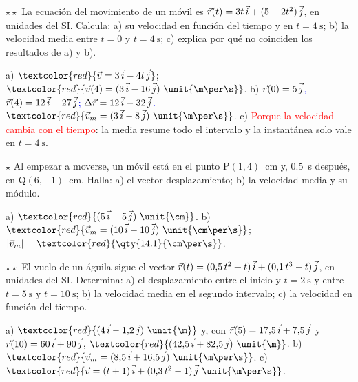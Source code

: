 \begin{exercise}
    \(\star\star\) La ecuación del movimiento de un móvil es \(\vec r(t) = 3t\,\vec{i} + (5 - 2t^2)\,\vec{j}\), en unidades del SI.
    Calcula: a) su velocidad en función del tiempo y en \(t = \qty{4}{\s}\); b) la velocidad media entre \(t = 0\) y
    \(t = \qty{4}{\s}\); c) explica por qué no coinciden los resultados de a) y b).
    \begin{solu}
        a) \(\textcolor{red}{\vec v = 3\,\ivec - 4t\,\jvec}\); \(\textcolor{red}{\vec v(4) = (3\,\ivec - 16\,\jvec)~\unit{\m\per\s}}\).
        b) \textcolor{blue}{\(\vec r(0) = 5\,\vec{j}\), \(\vec r(4) =
        12\,\vec{i} - 27\,\vec{j}\); \(\Delta\vec r = 12\,\vec{i} - 32\,\vec{j}\).} \(\textcolor{red}{\vec v_m = (3\,\ivec - 8\,\jvec)~\unit{\m\per\s}}\).
        c) \textcolor{red}{Porque la velocidad cambia con el tiempo}: la media resume todo el intervalo y la instantánea solo vale
        en \(t = \qty{4}{\s}\).
    \end{solu}
\end{exercise}

\begin{exercise}
    \(\star\) Al empezar a moverse, un móvil está en el punto P\((1, 4)\)~\unit{\cm} y, \qty{0.5}{\s} después, en Q\((6, -1)\)~\unit{\cm}.
    Halla: a) el vector desplazamiento; b) la velocidad media y su módulo.
    \begin{solu}
        a) \(\textcolor{red}{(5\,\ivec - 5\,\jvec)~\unit{\cm}}\). b) \(\textcolor{red}{\vec v_m = (10\,\ivec - 10\,\jvec)~\unit{\cm\per\s}}\);
        \(|\vec v_m| = \textcolor{red}{\qty{14.1}{\cm\per\s}}\).
    \end{solu}
\end{exercise}

\begin{exercise}
    \(\star\star\) El vuelo de un águila sigue el vector \(\vec r(t) = (0{,}5\,t^2 + t)\,\vec{i} + (0{,}1\,t^3 - t)\,\vec{j}\), en unidades
    del SI. Determina: a) el desplazamiento entre el inicio y \(t = \qty{2}{\s}\) y entre \(t = \qty{5}{\s}\) y \(t = \qty{10}{\s}\);
    b) la velocidad media en el segundo intervalo; c) la velocidad en función del tiempo.
    \begin{solu}
        a) \(\textcolor{red}{(4\,\ivec - 1{,}2\,\jvec)~\unit{\m}}\) y, con \(\vec r(5) = 17{,}5\,\vec{i} + 7{,}5\,\vec{j}\) y
        \(\vec r(10) = 60\,\vec{i} + 90\,\vec{j}\), \(\textcolor{red}{(42{,}5\,\ivec + 82{,}5\,\jvec)~\unit{\m}}\).
        b) \(\textcolor{red}{\vec v_m = (8{,}5\,\ivec + 16{,}5\,\jvec)~\unit{\m\per\s}}\). c) \(\textcolor{red}{\vec v = (t + 1)\,\ivec + (0{,}3\,t^2 - 1)\,\jvec~\unit{\m\per\s}}\).
    \end{solu}
\end{exercise}

